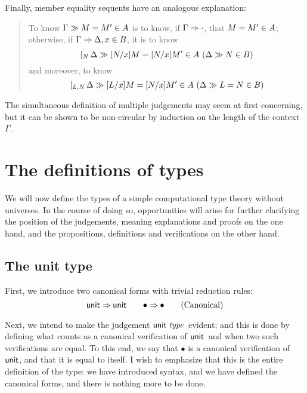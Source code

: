 \documentclass[main.tex]{subfiles}
\begin{document}
Finally, member equality sequents have an analogous explanation:

\begin{quote}
  To know $\Gamma\gg M=M'\in A$ is to know, if
  $\Gamma\Rightarrow\cdot$, that $M=M'\in A$; otherwise, if
  $\Gamma\Rightarrow\Delta,x\in B$, it is to know
  \[
    \genj{N}{
      \hyp{
        \sequent{\Delta}{
          \ver{[N/x]M=[N/x]M'}{A}
        }
      }{
        \sequent{\Delta}{
          \ver{N}{B}
        }
      }
    }
  \]
  and moreover, to know
  \[
    \genj{L,N}{
      \hyp{
        \sequent{\Delta}{
          \ver{[L/x]M=[N/x]M'}{A}
        }
      }{
        \sequent{\Delta}{
          \ver{L=N}{B}
        }
      }
    }
  \]
\end{quote}

The simultaneous definition of multiple judgements may seem at first
concerning, but it can be shown to be non-circular by induction on the length
of the context $\Gamma$.

\section{The definitions of types}

We will now define the types of a simple computational type theory without
universes. In the course of doing so, opportunities will arise for further
clarifying the position of the judgements, meaning explanations and proofs on
the one hand, and the propositions, definitions and verifications on the other
hand.

\subsection{The unit type}

First, we introduce two canonical forms with trivial reduction rules:
\begin{equation}
  \mathsf{unit}\Rightarrow\mathsf{unit}\qquad
  \bullet\Rightarrow\bullet
  \tag{Canonical}
\end{equation}

Next, we intend to make the judgement $\mathsf{unit}\;\mathit{type}$\ evident; and this is done by
defining what counts as a canonical verification of $\mathsf{unit}$\ and when two such
verifications are equal. To this end, we say that $\bullet$ is a canonical
verification of $\mathsf{unit}$, and that it is equal to itself.  I wish to emphasize
that this is the entire definition of the type: we have introduced syntax, and
we have defined the canonical forms, and there is nothing more to be done.
\end{document}
